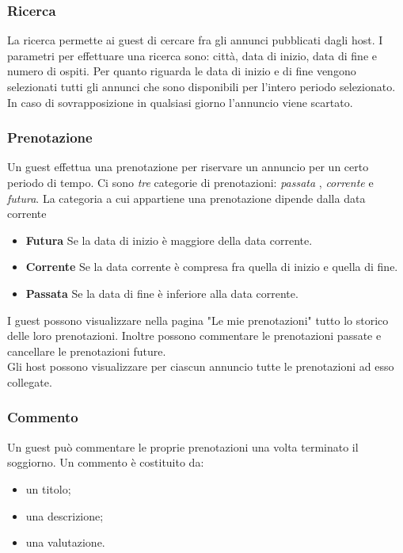 \documentclass[1_relazione.tex]{subfiles}
\begin{document}
\subsubsection{Ricerca} 
La ricerca permette ai guest di cercare fra gli annunci pubblicati dagli host. I parametri per effettuare una ricerca sono: città, data di inizio, data di fine e numero di ospiti. Per quanto riguarda le data di inizio e di fine vengono selezionati tutti gli annunci che sono disponibili per l'intero periodo selezionato. In caso di sovrapposizione in qualsiasi giorno l'annuncio viene scartato.

\subsubsection{Prenotazione} 
Un guest effettua una prenotazione per riservare un annuncio per un certo periodo di tempo. Ci sono \textit{tre} categorie di prenotazioni: \textit{passata} , \textit{corrente} e \textit{futura}.  La categoria a cui appartiene una prenotazione dipende dalla data corrente \\
\begin{itemize}
\item \textbf{Futura} Se la data di inizio \`{e} maggiore della data corrente.
\item \textbf{Corrente} Se la data corrente \`{e} compresa fra quella di inizio e quella di fine.
\item \textbf{Passata} Se la data di fine \`{e} inferiore alla data corrente.
\end{itemize}
I guest possono visualizzare nella pagina "Le mie prenotazioni" tutto lo storico delle loro prenotazioni. Inoltre possono commentare le prenotazioni passate e cancellare le prenotazioni future.\\
Gli host possono visualizzare per ciascun annuncio tutte le prenotazioni ad esso collegate.

\subsubsection{Commento} 
Un guest pu\`{o} commentare le proprie prenotazioni una volta terminato il soggiorno. Un commento \`{e} costituito da:
\begin{itemize}
 \item un titolo;
 \item una descrizione;
 \item una valutazione.
\end{itemize}
\end{document}
